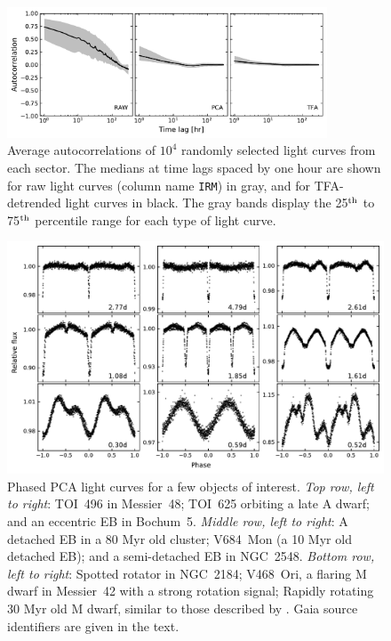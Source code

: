 \documentclass[12pt,twocolumn,tighten]{aastex62}
\begin{document}
\begin{figure}[!t]
	\begin{center}
		\leavevmode
		\includegraphics[width=0.85\textwidth]{avg_acf.pdf}
	\end{center}
	\vspace{-0.7cm}
  \caption{
    Average autocorrelations of $10^4$ randomly selected light curves
    from each sector.  The medians at time lags spaced by one hour are
    shown for raw light curves (column name \texttt{IRM}) in gray, and
    for TFA-detrended light curves in black.  The gray bands display
    the 25$^{\rm th}$ to 75$^{\rm th}$ percentile range for each type
    of light curve.
  \label{fig:avg_acf}
	}
\end{figure}

\begin{figure}[!t]
	\begin{center}
		\leavevmode
		\includegraphics[width=1\textwidth]{quilt_s6_s7.pdf}
	\end{center}
	\vspace{-0.8cm}
	\caption{
		Phased PCA light curves for a few objects of interest.
		{\it Top row, left to right}:
    TOI~496 in Messier~48; TOI~625 orbiting a late A dwarf; and an
    eccentric EB in Bochum~5.
		{\it Middle row, left to right}:
    A detached EB in a 80 Myr old cluster; V684~Mon (a 10 Myr old
    detached EB); and a semi-detached EB in NGC~2548.
		{\it Bottom row, left to right}:
    Spotted rotator in NGC~2184; V468~Ori, a flaring M dwarf in
    Messier~42 with a strong rotation signal; Rapidly rotating 30 Myr
    old M dwarf, similar to those described by
    \citet{zhan_complex_2019}.  Gaia source identifiers are given in
    the text.
	\label{fig:quilt}
	}
\end{figure}
\end{document}

